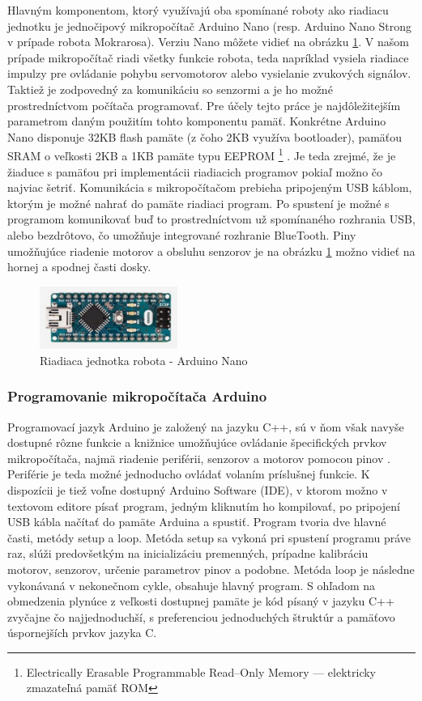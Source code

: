 Hlavným komponentom, ktorý využívajú oba spomínané roboty ako riadiacu jednotku je jednočipový mikropočítač Arduino Nano (resp. Arduino Nano Strong v prípade robota Mokrarosa). Verziu Nano môžete vidieť na obrázku \ref{obr:arduino}. V našom prípade mikropočítač riadi všetky funkcie robota, teda napríklad vysiela riadiace impulzy pre ovládanie pohybu servomotorov alebo vysielanie zvukových signálov. Taktiež je zodpovedný za komunikáciu so senzormi a je ho možné prostredníctvom počítača programovať. Pre účely tejto práce je najdôležitejším parametrom daným použitím tohto komponentu pamäť. Konkrétne Arduino Nano disponuje 32KB flash pamäte (z čoho 2KB využíva bootloader), pamäťou SRAM o veľkosti 2KB a 1KB pamäte typu EEPROM \footnote{Electrically Erasable Programmable Read--Only Memory --- elektricky zmazateľná pamäť ROM} \cite{ArduinoNanoSpecification}. Je teda zrejmé, že je žiaduce s pamäťou pri implementácii riadiacich programov pokiaľ možno čo najviac šetriť. Komunikácia s mikropočítačom prebieha pripojeným USB káblom, ktorým je možné nahrať do pamäte riadiaci program. Po spustení je možné s programom komunikovať buď to prostredníctvom už spomínaného rozhrania USB, alebo bezdrôtovo, čo umožňuje integrované rozhranie BlueTooth. Piny umožňujúce riadenie motorov a obsluhu senzorov je na obrázku \ref{obr:arduino} možno vidieť na hornej a spodnej časti dosky.

\begin{figure}
\centerline{\includegraphics[width=0.4\textwidth]{images/arduino-nano}}
\caption[Riadiaca jednotka - Arduino Nano]{Riadiaca jednotka robota - Arduino Nano}
\label{obr:arduino}
\end{figure}

\subsubsection{Programovanie mikropočítača Arduino}
Programovací jazyk Arduino je založený na jazyku C++, sú v ňom však navyše dostupné rôzne funkcie a knižnice umožňujúce ovládanie špecifických prvkov mikropočítača, najmä riadenie periférii, senzorov a motorov pomocou pinov \cite{ArduinoLanguage}. Periférie je teda možné jednoducho ovládať volaním príslušnej funkcie. K dispozícii je tiež voľne dostupný Arduino Software (IDE), v ktorom možno v textovom editore písať program, jedným kliknutím ho kompilovať, po pripojení USB kábla načítať do pamäte Arduina a spustiť. Program tvoria dve hlavné časti, metódy setup a loop. Metóda setup sa vykoná pri spustení programu práve raz, slúži predovšetkým na inicializáciu premenných, prípadne kalibráciu motorov, senzorov, určenie parametrov pinov a podobne. Metóda loop je následne vykonávaná v nekonečnom cykle, obsahuje hlavný program. S ohľadom na obmedzenia plynúce z veľkosti dostupnej pamäte je kód písaný v jazyku C++ zvyčajne čo najjednoduchší, s preferenciou jednoduchých štruktúr a pamäťovo úspornejších prvkov jazyka C.

